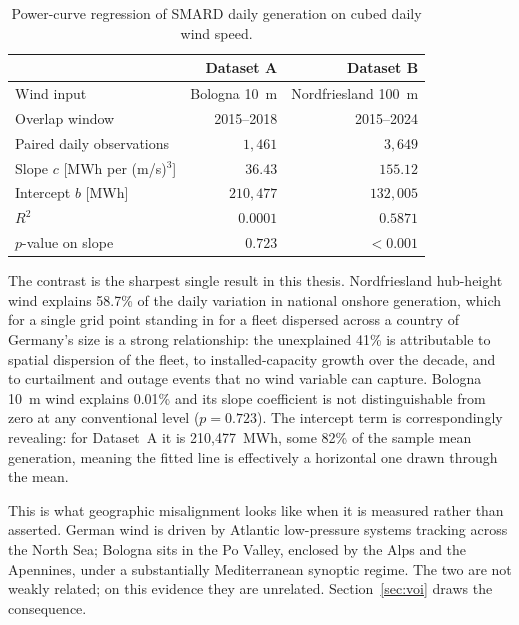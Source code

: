 \documentclass[11pt, a4paper, twoside]{article}
\begin{document}
\begin{table}[htbp]
\centering
\caption{Power-curve regression of SMARD daily generation on cubed daily wind speed.}
\label{tab:powercurve}
\begin{tabular}{l r r}
\toprule
& \textbf{Dataset A} & \textbf{Dataset B} \\
\midrule
Wind input & Bologna 10~m & Nordfriesland 100~m \\
Overlap window & 2015--2018 & 2015--2024 \\
Paired daily observations & $1{,}461$ & $3{,}649$ \\
Slope $c$ [MWh per (m/s)$^3$] & $36.43$ & $155.12$ \\
Intercept $b$ [MWh] & $210{,}477$ & $132{,}005$ \\
$R^2$ & $\mathbf{0.0001}$ & $\mathbf{0.5871}$ \\
$p$-value on slope & $0.723$ & $<0.001$ \\
\bottomrule
\end{tabular}
\end{table}

The contrast is the sharpest single result in this thesis. Nordfriesland hub-height wind explains 58.7\% of the daily variation in national onshore generation, which for a single grid point standing in for a fleet dispersed across a country of Germany's size is a strong relationship: the unexplained 41\% is attributable to spatial dispersion of the fleet, to installed-capacity growth over the decade, and to curtailment and outage events that no wind variable can capture. Bologna 10~m wind explains 0.01\% and its slope coefficient is not distinguishable from zero at any conventional level ($p = 0.723$). The intercept term is correspondingly revealing: for Dataset~A it is 210{,}477~MWh, some 82\% of the sample mean generation, meaning the fitted line is effectively a horizontal one drawn through the mean.

This is what geographic misalignment looks like when it is measured rather than asserted. German wind is driven by Atlantic low-pressure systems tracking across the North Sea; Bologna sits in the Po Valley, enclosed by the Alps and the Apennines, under a substantially Mediterranean synoptic regime. The two are not weakly related; on this evidence they are unrelated. Section~\ref{sec:voi} draws the consequence.
\end{document}
